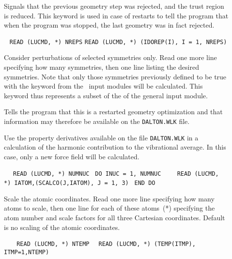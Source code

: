 \begin{description}
\item[] Signals that the previous geometry step was
rejected, and the trust
region is
reduced. This keyword is
used in case of restarts to tell the program that when the program
was stopped, the last geometry was in fact rejected.

\item[]\verb| |\newline
\verb|READ (LUCMD, *) NREPS|\newline
\verb|READ (LUCMD, *) (IDOREP(I), I = 1, NREPS)|

Consider perturbations of selected
symmetries only.  Read one more line specifying how many
symmetries, then one line listing the desired symmetries. Note that
only those symmetries previously defined to be true with the keyword
 from the \aba\ input modules will be calculated. This
keyword thus represents a subset of the  of the general
input module.

\item[] Tells the program that this is a restarted
geometry optimization and that
information may therefore be available
on the \verb|DALTON.WLK| file.

\item[] Use the property derivatives available on the file 
\verb|DALTON.WLK| in a calculation of the harmonic contribution to the
vibrational average. In this case, only a new force field will be calculated.

\item[]\verb| |\newline
\verb| READ (LUCMD, *) NUMNUC|\newline
\verb| DO INUC = 1, NUMNUC|\newline
\verb|    READ (LUCMD, *) IATOM,(SCALCO(J,IATOM), J = 1, 3)|\newline
\verb| END DO|

Scale the atomic coordinates.  Read one more
line specifying how many atoms to scale, then one line for
each of these atoms~(*) specifying the atom number and scale
factors for all three Cartesian coordinates. Default is no scaling of
the atomic coordinates.


\item[]\verb| |\newline
\verb|  READ (LUCMD, *) NTEMP|\newline
\verb|  READ (LUCMD, *) (TEMP(ITMP), ITMP=1,NTEMP)|


\end{description}
